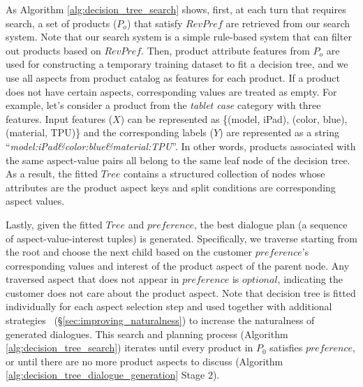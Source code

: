 As Algorithm \ref{alg:decision_tree_search} shows, first, at each turn that requires search, a set of products ($P_o$) that satisfy $RevPref$ are retrieved from our search system. Note that our search system is a simple rule-based system that can filter out products based on $RevPref$. Then, product attribute features from $P_o$ are used for constructing a temporary training dataset to fit a decision tree, and we use all aspects from product catalog as features for each product. If a product does not have certain aspects, corresponding values are treated as empty. For example, let's consider a product from the \textit{tablet case} category with three features. Input features ($X$) can be represented as \{(model, iPad), (color, blue), (material, TPU)\} and the corresponding labels ($Y$) are represented as a string ``\textit{model:iPad\&color:blue\&material:TPU}''. In other words, products associated with the same aspect-value pairs all belong to the same leaf node of the decision tree. As a result, the fitted $Tree$ contains a structured collection of nodes whose attributes are the product aspect keys and split conditions are corresponding aspect values. %



Lastly, given the fitted $Tree$ and $preference$, the best dialogue plan (a sequence of aspect-value-interest tuples) is generated. Specifically, we traverse starting from the root and choose the next child based on the customer $preference$'s corresponding values and interest of the product aspect of the parent node. Any traversed aspect that does not appear in $preference$ is $optional$, indicating the customer does not care about the product aspect. Note that decision tree is fitted individually for each aspect selection step and used together with additional strategies~
(\S \ref{sec:improving_naturalness}) to increase the naturalness of generated dialogues. This search and planning process (Algorithm \ref{alg:decision_tree_search}) iterates until every product in $P_0$ satisfies $preference$, or until there are no more product aspects to discuss (Algorithm \ref{alg:decision_tree_dialogue_generation} Stage 2).

